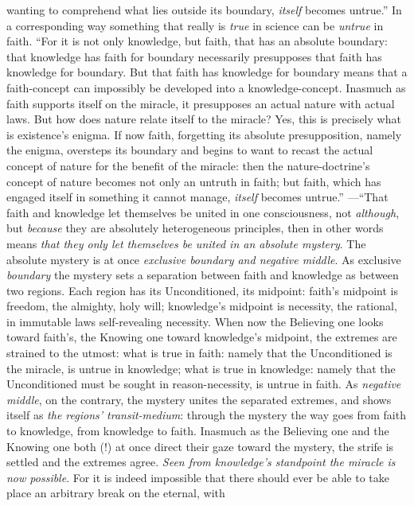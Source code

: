 \documentclass[12pt,a4paper]{book}
\begin{document}
wanting to comprehend what lies outside its boundary, \emph{itself} becomes untrue.'' In a corresponding
way something that really is \emph{true} in science can be \emph{untrue} in faith. ``For it is not only
knowledge, but faith, that has an absolute boundary: that knowledge has faith for boundary
necessarily presupposes that faith has knowledge for boundary. But that faith has knowledge for
boundary means that a faith-concept can impossibly be developed into a knowledge-concept. Inasmuch
as faith supports itself on the miracle, it presupposes an actual nature with actual laws. But how
does nature relate itself to the miracle? Yes, this is precisely what is existence's enigma. If now
faith, forgetting its absolute presupposition, namely the enigma, oversteps its boundary and begins
to want to recast the actual concept of nature for the benefit of the miracle: then the
nature-doctrine's concept of nature becomes not only an untruth in faith; but faith, which has
engaged itself in something it cannot manage, \emph{itself} becomes untrue.'' ---``That faith and knowledge
let themselves be united in one consciousness, not \emph{although}, but \emph{because} they are absolutely
heterogeneous principles, then in other words means \emph{that they only let themselves be united in an
absolute mystery}. The absolute mystery is at once \emph{exclusive boundary and negative
middle}. As exclusive \emph{boundary} the mystery sets a separation between faith and knowledge as between
two regions. Each region has its Unconditioned, its midpoint: faith's midpoint is freedom, the
almighty, holy will; knowledge's midpoint is necessity, the rational, in immutable laws self-revealing
necessity. When now the Believing one looks toward faith's, the Knowing one toward knowledge's
midpoint, the extremes are strained to the utmost: what is true in faith: namely that the Unconditioned
is the miracle, is untrue in knowledge; what is true in knowledge: namely that the Unconditioned must
be sought in reason-necessity, is untrue in faith. As \emph{negative middle}, on the contrary, the
mystery unites the separated extremes, and shows itself as \emph{the regions' transit-medium}: through
the mystery the way goes from faith to knowledge, from knowledge to faith. Inasmuch as the Believing
one and the Knowing one both (!) at once direct their gaze toward the mystery, the strife is settled
and the extremes agree. \emph{Seen from knowledge's standpoint the miracle is now possible}. For it is
indeed impossible that there should ever be able to take place an arbitrary break on the eternal, with
\end{document}
